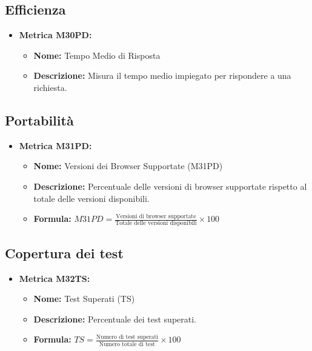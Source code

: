 \subsection{Efficienza}
\begin{itemize}
    \item \textbf{Metrica M30PD:}
          \begin{itemize}
              \item \textbf{Nome:} Tempo Medio di Risposta
              \item \textbf{Descrizione:} Misura il tempo medio impiegato per rispondere a una richiesta.
          \end{itemize}
\end{itemize}


\subsection{Portabilità}

\begin{itemize}
    \item \textbf{Metrica M31PD:}
          \begin{itemize}
              \item \textbf{Nome:} Versioni dei Browser Supportate (M31PD)
              \item \textbf{Descrizione:} Percentuale delle versioni di browser supportate rispetto al totale delle versioni disponibili.
              \item \textbf{Formula:} $M31PD = \frac{\text{Versioni di browser supportate}}{\text{Totale delle versioni disponibili}} \times 100$
          \end{itemize}
\end{itemize}

\subsection{Copertura dei test}
\begin{itemize}
    \item \textbf{Metrica M32TS:}
          \begin{itemize}
              \item \textbf{Nome:} Test Superati (TS)
              \item \textbf{Descrizione:} Percentuale dei test superati.
              \item \textbf{Formula:} $TS = \frac{\text{Numero di test superati}}{\text{Numero totale di test}} \times 100$
          \end{itemize}
\end{itemize}
